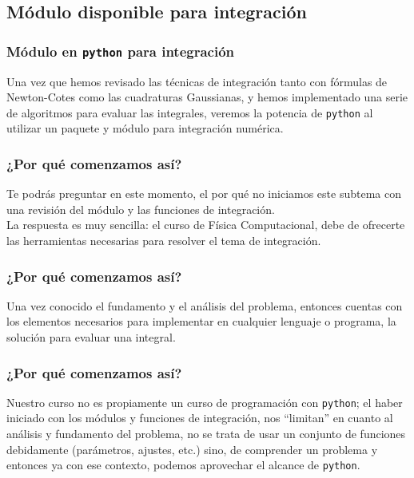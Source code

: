 \subsection{Módulo disponible para integración}
\begin{frame}
\frametitle{Módulo en \texttt{python} para integración}
Una vez que hemos revisado las técnicas de integración tanto con fórmulas de Newton-Cotes como las cuadraturas Gaussianas, y hemos implementado una serie de algoritmos para evaluar las integrales, veremos la potencia de \texttt{python} al utilizar un paquete y módulo para integración numérica.
\end{frame}
\begin{frame}
\frametitle{¿Por qué comenzamos así?}
Te podrás preguntar en este momento, el por qué no iniciamos este subtema con una revisión del módulo y las funciones de integración.
\\
\bigskip
La respuesta es muy sencilla: el curso de Física Computacional, debe de ofrecerte las herramientas necesarias para resolver el tema de integración.
\end{frame}
\begin{frame}
\frametitle{¿Por qué comenzamos así?}
Una vez conocido el fundamento y el análisis del problema, entonces cuentas con los elementos necesarios para implementar en cualquier lenguaje o programa, la solución para evaluar una integral.
\end{frame}
\begin{frame}
\frametitle{¿Por qué comenzamos así?}
Nuestro curso no es propiamente un curso de programación con \texttt{python}; el haber iniciado con los módulos y funciones de integración, nos \enquote{limitan} en cuanto al análisis y fundamento del problema, no se trata de usar un conjunto de funciones debidamente (parámetros, ajustes, etc.) sino, de comprender un problema y entonces ya con ese contexto, podemos aprovechar el alcance de \texttt{python}.
\end{frame}
